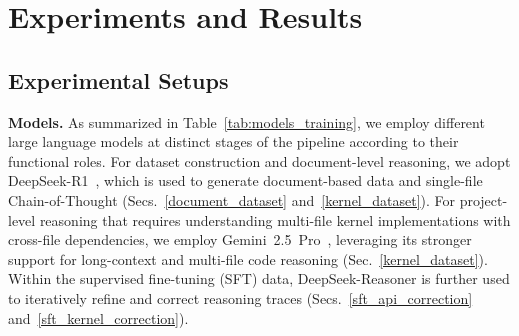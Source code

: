 \section{Experiments and Results}
\label{experiments}

\subsection{Experimental Setups}

\textbf{Models.}
As summarized in Table~\ref{tab:models_training}, we employ different large language models at distinct stages of the pipeline according to their functional roles. For dataset construction and document-level reasoning, we adopt DeepSeek-R1~\cite{abs250112948}, which is used to generate document-based data and single-file Chain-of-Thought (Secs.~\ref{document_dataset} and~\ref{kernel_dataset}). For project-level reasoning that requires understanding multi-file kernel implementations with cross-file dependencies, we employ Gemini~2.5~Pro~\cite{google_gemini_2_5_pro}, leveraging its stronger support for long-context and multi-file code reasoning (Sec.~\ref{kernel_dataset}). Within the supervised fine-tuning (SFT) data, DeepSeek-Reasoner is further used to iteratively refine and correct reasoning traces (Secs.~\ref{sft_api_correction} and~\ref{sft_kernel_correction}).

